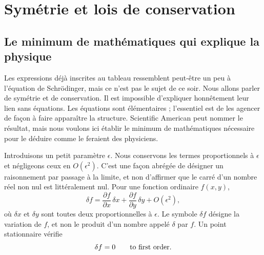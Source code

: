 \chapter{Symétrie et lois de conservation}


\section{Le minimum de mathématiques qui explique la physique}

Les expressions déjà inscrites au tableau ressemblent peut-être un peu à l’équation de Schrödinger, mais ce n’est pas le sujet de ce soir. Nous allons parler de symétrie et de conservation. Il est impossible d’expliquer honnêtement leur lien sans équations. Les équations sont élémentaires ; l’essentiel est de les agencer de façon à faire apparaître la structure. Scientific American peut nommer le résultat, mais nous voulons ici établir le minimum de mathématiques nécessaire pour le déduire comme le feraient des physiciens.

Introduisons un petit paramètre \(\epsilon\). Nous conservons les termes proportionnels à \(\epsilon\) et négligeons ceux en \(O(\epsilon^2)\). C’est une façon abrégée de désigner un raisonnement par passage à la limite, et non d’affirmer que le carré d’un nombre réel non nul est littéralement nul. Pour une fonction ordinaire \(f(x,y)\),
\begin{equation}
  \delta f
  =\frac{\partial f}{\partial x}\,\delta x
   +\frac{\partial f}{\partial y}\,\delta y
   +O(\epsilon^2),
  \label{eq:first-variation-f}
\end{equation}
où \(\delta x\) et \(\delta y\) sont toutes deux proportionnelles à \(\epsilon\). Le symbole \(\delta f\) désigne la variation de \(f\), et non le produit d’un nombre appelé \(\delta\) par \(f\). Un point stationnaire vérifie
\begin{equation}
  \delta f=0
  \qquad\hbox{to first order.}
  \label{eq:stationary-f}
\end{equation}

